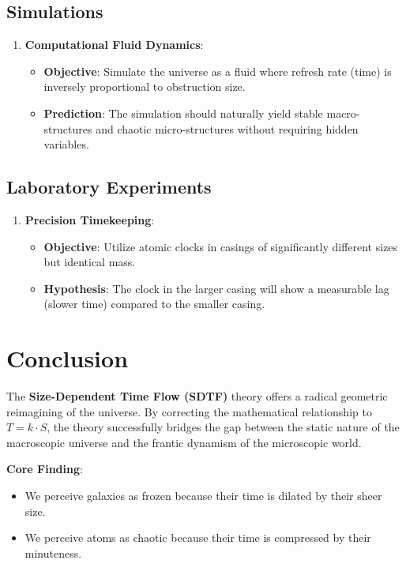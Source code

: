 \documentclass[12pt]{article}
\begin{document}
\subsection{Simulations}

\begin{enumerate}
    \item \textbf{Computational Fluid Dynamics}:
    \begin{itemize}
        \item \textbf{Objective}: Simulate the universe as a fluid where refresh rate (time) is inversely proportional to obstruction size.
        \item \textbf{Prediction}: The simulation should naturally yield stable macro-structures and chaotic micro-structures without requiring hidden variables.
    \end{itemize}
\end{enumerate}

\subsection{Laboratory Experiments}

\begin{enumerate}
    \item \textbf{Precision Timekeeping}:
    \begin{itemize}
        \item \textbf{Objective}: Utilize atomic clocks in casings of significantly different sizes but identical mass.
        \item \textbf{Hypothesis}: The clock in the larger casing will show a measurable lag (slower time) compared to the smaller casing.
    \end{itemize}
\end{enumerate}

\section{Conclusion}

The \textbf{Size-Dependent Time Flow (SDTF)} theory offers a radical geometric reimagining of the universe. By correcting the mathematical relationship to \( T = k \cdot S \), the theory successfully bridges the gap between the static nature of the macroscopic universe and the frantic dynamism of the microscopic world.

\textbf{Core Finding}:
\begin{itemize}
    \item We perceive galaxies as frozen because their time is dilated by their sheer size.
    \item We perceive atoms as chaotic because their time is compressed by their minuteness.
\end{itemize}
\end{document}
